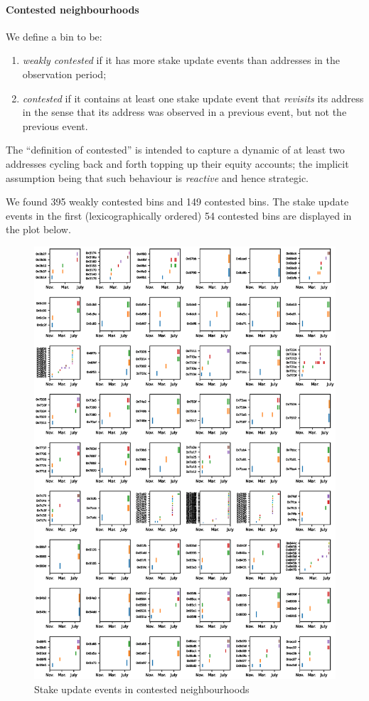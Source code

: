 \paragraph{Contested neighbourhoods}
We define a bin to be:
\begin{enumerate}
  \item \emph{weakly contested} if it has more stake update events than addresses in the observation period;
  \item \emph{contested} if it contains at least one stake update event that \emph{revisits} its address in the sense that its address was observed in a previous event, but not the previous event.
\end{enumerate}
The ``definition of contested'' is intended to capture a dynamic of at least two addresses cycling back and forth topping up their equity accounts; the implicit assumption being that such behaviour is \emph{reactive} and hence strategic.

We found 395 weakly contested bins and 149 contested bins. 
%
The stake update events in the first (lexicographically ordered) 54 contested bins are displayed in the plot below.


\begin{center}
\begin{figure}[p]
  \includegraphics[width=\textwidth]{common/contested.eps}
  \caption{Stake update events in contested neighbourhoods}
  \label{event-plot}
\end{figure}
\end{center}


